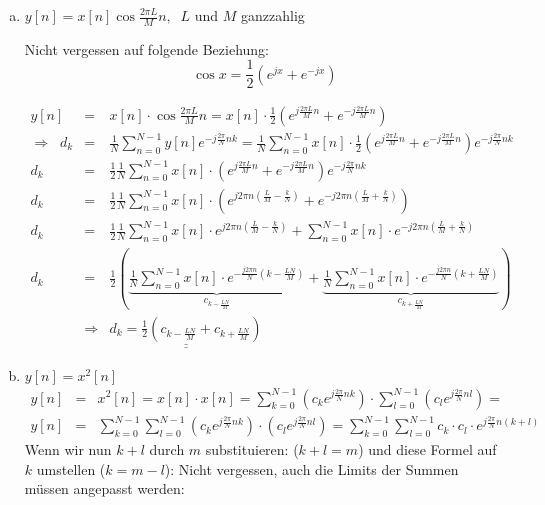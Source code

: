 \begin{uebsp}
\begin{Answer}
\begin{enumerate}[a)]
        \item $y[n]=x[n]\cos\frac{2\pi L}{M}n,\;\;L$ und $M$ ganzzahlig
            \begin{uebsp_theory}
                Nicht vergessen auf folgende Beziehung: \[\cos x=\frac{1}{2}\left(e^{jx}+e^{-jx}\right)\]
            \end{uebsp_theory}
            \begin{eqnarray*}
                y[n]&=&x[n]\cdot \cos\frac{2\pi L}{M}n=
                x[n]\cdot\frac{1}{2}\left(e^{j\frac{2\pi L}{M}n}+e^{-j\frac{2\pi L}{M}n}\right)\\
                \Rightarrow\;\;d_k&=&\frac{1}{N}\sum_{n=0}^{N-1}y[n]e^{-j\frac{2\pi}{N}nk}=
                \frac{1}{N}\sum_{n=0}^{N-1}x[n]\cdot\frac{1}{2}\left(e^{j\frac{2\pi L}{M}n}+e^{-j\frac{2\pi L}{M}n}\right)e^{-j\frac{2\pi}{N}nk}\\
                d_k&=&\frac{1}{2}\frac{1}{N}\sum_{n=0}^{N-1}x[n]\cdot\left(e^{j\frac{2\pi L}{M}n}+e^{-j\frac{2\pi L}{M}n}\right)e^{-j\frac{2\pi}{N}nk}\\
                d_k&=&\frac{1}{2}\frac{1}{N}\sum_{n=0}^{N-1}x[n]\cdot\left(e^{j2\pi n(\frac{L}{M}-\frac{k}{N})}+e^{-j2\pi n(\frac{L}{M}+\frac{k}{N})}\right)\\
            d_k&=&\frac{1}{2}\frac{1}{N}\sum_{n=0}^{N-1}x[n]\cdot e^{j2\pi n(\frac{L}{M}-\frac{k}{N})}+\sum_{n=0}^{N-1}x[n]\cdot e^{-j2\pi n(\frac{L}{M}+\frac{k}{N})}\\
                d_k&=&\frac{1}{2}\left(\underbrace{\frac{1}{N}\sum_{n=0}^{N-1}x[n]\cdot e^{-\frac{j2\pi n}{N}(k-\frac{LN}{M})}}_{c_{k-\frac{LN}{M}}}+\underbrace{\frac{1}{N}\sum_{n=0}^{N-1}x[n]\cdot e^{-\frac{j2\pi n}{N}(k+\frac{LN}{M})}}_{c_{k+\frac{LN}{M}}}\right)\\
                   &\Rightarrow & \underline{\underline{d_k=\frac{1}{2}\left({c_{k-\frac{LN}{M}}}+{c_{k+\frac{LN}{M}}}\right)}}
            \end{eqnarray*}
        \item $y[n]=x^2[n]$
            \begin{eqnarray*}
                y[n]&=&x^2[n]=x[n]\cdot x[n]= \sum_{k=0}^{N-1}\left(c_ke^{j\frac{2\pi}{N}nk}\right)\cdot \sum_{l=0}^{N-1}\left(c_le^{j\frac{2\pi}{N}nl}\right)=\\
                y[n]&=& \sum_{k=0}^{N-1}\sum_{l=0}^{N-1}\left(c_ke^{j\frac{2\pi}{N}nk}\right)\cdot \left(c_le^{j\frac{2\pi}{N}nl}\right)=\sum_{k=0}^{N-1}\sum_{l=0}^{N-1}c_k\cdot c_l\cdot e^{j\frac{2\pi}{N}n(k+l)}
            \end{eqnarray*}
            Wenn wir nun $k+l$ durch $m$ substituieren: ($k+l=m$) und diese Formel auf $k$ umstellen ($k=m-l$):
            Nicht vergessen, auch die Limits der Summen müssen angepasst werden:\\


\end{enumerate}
\end{Answer}
\end{uebsp}
